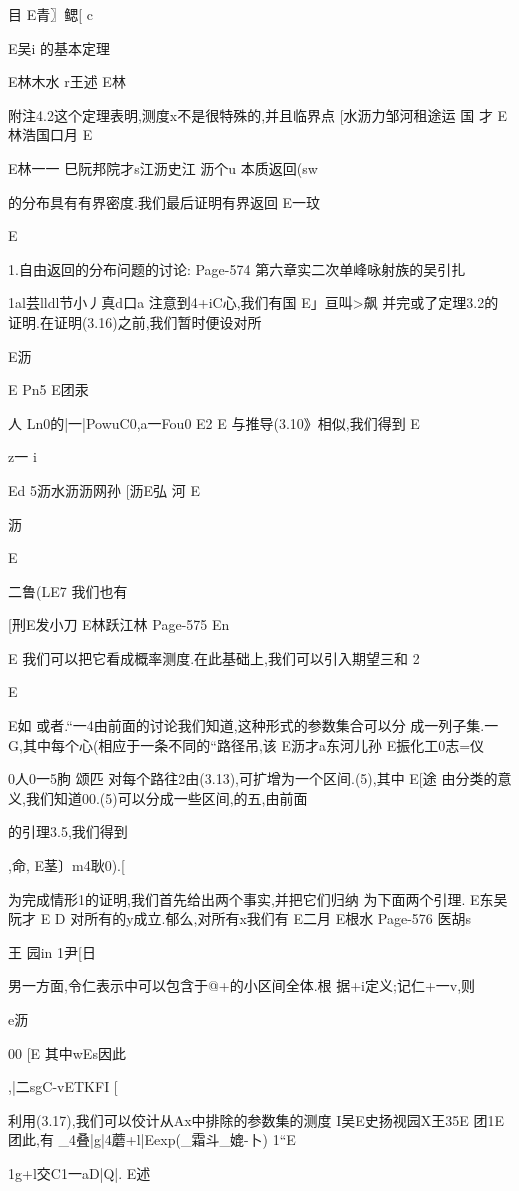 {{目
E青〗鳃[
c

E吴i
的基本定理

E林木水
r王述
E林

附注4.2这个定理表明,测度x不是很特殊的,并且临界点
[水沥力邹河租途运
国
才
E林浩国口月
E

E林一一
巳阮邦院才s江沥史江
沥个u
本质返回(sw}的分布具有有界密度.我们最后证明有界返回{}
E一玟

E

1.自由返回的分布问题的讨论:
Page-574
第六章实二次单峰咏射族的吴引扎

1al芸lldl节小丿真d口a
注意到4+iC心,我们有国
E」亘叫>飙
并完或了定理3.2的证明.在证明(3.16)之前,我们暂时便设对所

E沥

E
Pn5
E团汞

人
Ln0的|一|PowuC0,a一Fou0
E2
E
与推导(3.10》相似,我们得到
E

z一
i

Ed
5沥水沥沥网孙
[沥E弘
河
E

沥

E

二鲁(LE7
我们也有

[刑E发小刀
E林跃江林
Page-575
En

E
我们可以把它看成概率测度.在此基础上,我们可以引入期望三和
2

E

E如
或者.“一4由前面的讨论我们知道,这种形式的参数集合可以分
成一列子集.一G,其中每个心(相应于一条不同的“路径吊,该
E沥才a东河儿孙
E振化工0志=仪

0人0一5朐
颂匹
对每个路往2由(3.13),可扩增为一个区间.(5),其中
E[途
由分类的意义,我们知道00.(5)可以分成一些区间,的五,由前面

的引理3.5,我们得到

,命,
E茎〕m4耿0).[

为完成情形1的证明,我们首先给出两个事实,并把它们归纳
为下面两个引理.
E东吴阮才
E
D
对所有的y成立.郁么,对所有x我们有
E二月
E根水
Page-576
医胡s

王
园in
1尹[日

男一方面,令仁表示中可以包含于@+的小区间全体.根
据+i定义;记仁+一v,则

e沥

00
[E
其中wEs因此

,|二sgC-vETKFI
[

利用(3.17),我们可以佼计从Ax中排除的参数集的测度
I吴E史扬视园X王35E
团1E
团此,有
_4叠|g|4蘑+l|Eexp(_霜斗_媲-卜)
1“E

1g+l交C1一aD|Q|.
E述

}

